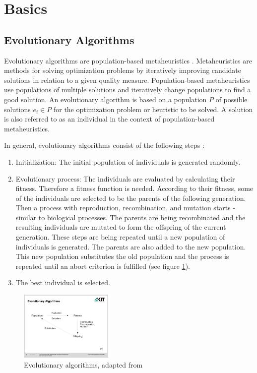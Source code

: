\section{Basics}

\subsection{Evolutionary Algorithms} \label{sec:EA}

Evolutionary algorithms are population-based metaheuristics \cite{EA}. Metaheuristics are methods for solving optimization problems by iteratively improving candidate solutions in relation to a given quality measure.
Population-based metaheuristics use populations of multiple solutions and iteratively change populations to find a good solution.
An evolutionary algorithm is based on a population $P$ of possible solutions $e_i \in P$ for the optimization problem or heuristic to be solved. A solution is also referred to as an individual in the context of population-based metaheuristics.

In general, evolutionary algorithms consist of the following steps \cite{EA}:

\begin{enumerate}
\item Initialization: The initial population of individuals is generated randomly.

\item Evolutionary process: The individuals are evaluated by calculating their fitness. Therefore a fitness function is needed.
According to their fitness, some of the individuals are selected to be the parents of the following generation.
Then a process with reproduction, recombination, and mutation starts - similar to biological processes.
The parents are being recombinated and the resulting individuals are mutated to form the offspring of the current generation.
These steps are being repeated until a new population of individuals is generated. The parents are also added to the new population. This new population substitutes the old population and the process is repeated until an abort criterion is fulfilled  (see figure \ref{fig:EA}).

\item The best individual is selected.
\end{enumerate}


\begin{figure}
	\begin{center}
		\includegraphics[trim = 2.2cm 6cm 4.1cm 6cm, clip, width=0.4\textwidth]{EA}
	\end{center}
	\caption{Evolutionary algorithms, adapted from \cite{EA}}
	\label{fig:EA}
\end{figure}


